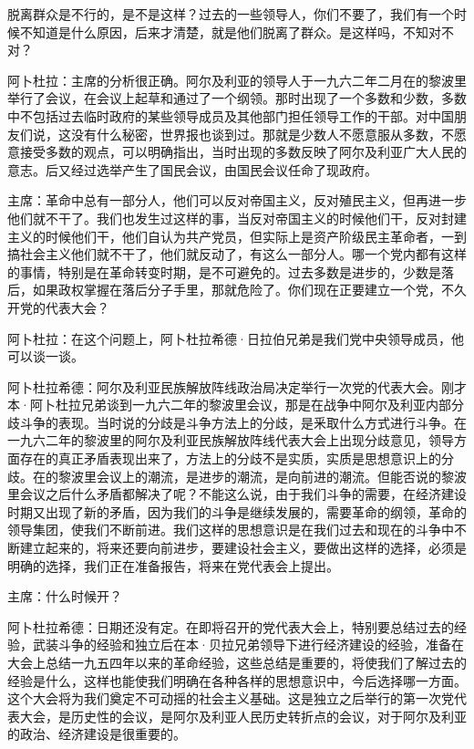 脱离群众是不行的，是不是这样？过去的一些领导人，你们不要了，我们有一个时候不知道是什么原因，后来才清楚，就是他们脱离了群众。是这样吗，不知对不对？

阿卜杜拉：主席的分析很正确。阿尔及利亚的领导人于一九六二年二月在的黎波里举行了会议，在会议上起草和通过了一个纲领。那时出现了一个多数和少数，多数中不包括过去临时政府的某些领导成员及其他部门担任领导工作的干部。对中国朋友们说，这没有什么秘密，世界报也谈到过。那就是少数人不愿意服从多数，不愿意接受多数的观点，可以明确指出，当时出现的多数反映了阿尔及利亚广大人民的意志。后又经过选举产生了国民会议，由国民会议任命了现政府。

主席：革命中总有一部分人，他们可以反对帝国主义，反对殖民主义，但再进一步他们就不干了。我们也发生过这样的事，当反对帝国主义的时候他们干，反对封建主义的时候他们干，他们自认为共产党员，但实际上是资产阶级民主革命者，一到搞社会主义他们就不干了，他们就反动了，有这么一部分人。哪一个党内都有这样的事情，特别是在革命转变时期，是不可避免的。过去多数是进步的，少数是落后，如果政权掌握在落后分子手里，那就危险了。你们现在正要建立一个党，不久开党的代表大会？

阿卜杜拉：在这个问题上，阿卜杜拉希德·日拉伯兄弟是我们党中央领导成员，他可以谈一谈。

阿卜杜拉希德：阿尔及利亚民族解放阵线政治局决定举行一次党的代表大会。刚才本·阿卜杜拉兄弟谈到一九六二年的黎波里会议，那是在战争中阿尔及利亚内部分歧斗争的表现。当时说的分歧是斗争方法上的分歧，是釆取什么方式进行斗争。在一九六二年的黎波里的阿尔及利亚民族解放阵线代表大会上出现分歧意见，领导方面存在的真正矛盾表现出来了，方法上的分歧不是实质，实质是思想意识上的分歧。在的黎波里会议上的潮流，是进步的潮流，是向前进的潮流。但能否说的黎波里会议之后什么矛盾都解决了呢？不能这么说，由于我们斗争的需要，在经济建设时期又出现了新的矛盾，因为我们的斗争是继续发展的，需要革命的纲领，革命的领导集团，使我们不断前进。我们这样的思想意识是在我们过去和现在的斗争中不断建立起来的，将来还要向前进步，要建设社会主义，要做出这样的选择，必须是明确的选择，我们正在准备报告，将来在党代表会上提出。

主席：什么时候开？

阿卜杜拉希德：日期还没有定。在即将召开的党代表大会上，特别要总结过去的经验，武装斗争的经验和独立后在本·贝拉兄弟领导下进行经济建设的经验，准备在大会上总结一九五四年以来的革命经验，这些总结是重要的，将使我们了解过去的经验是什么，这样也能使我们明确在各种各样的思想意识中，今后选择哪一方面。这个大会将为我们奠定不可动摇的社会主义基础。这是独立之后举行的第一次党代表大会，是历史性的会议，是阿尔及利亚人民历史转折点的会议，对于阿尔及利亚的政治、经济建设是很重要的。

